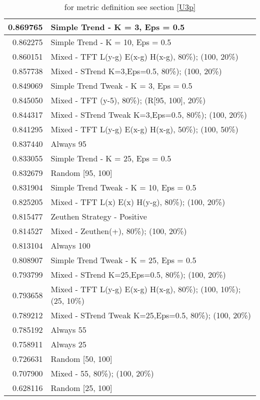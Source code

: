 \begin{table}[!hbtp]
\begin{footnotesize}
\begin{tabular}{|r|l|}
0.869765 & Simple Trend - K = 3, Eps = 0.5\\ \hline
0.862275 & Simple Trend - K = 10, Eps = 0.5\\ \hline
0.860151 & Mixed - {TFT L(y-g) E(x-g) H(x-g), 80\%); (100, 20\%)}\\ \hline
0.857738 & Mixed - {STrend K=3,Eps=0.5, 80\%); (100, 20\%)}\\ \hline
0.849069 & Simple Trend Tweak - K = 3, Eps = 0.5\\ \hline
0.845050 & Mixed - {TFT (y-5), 80\%); (R[95, 100], 20\%)}\\ \hline
0.844317 & Mixed - {STrend Tweak K=3,Eps=0.5, 80\%); (100, 20\%)}\\ \hline
0.841295 & Mixed - {TFT L(y-g) E(x-g) H(x-g), 50\%); (100, 50\%)}\\ \hline
0.837440 & Always 95\\ \hline
0.833055 & Simple Trend - K = 25, Eps = 0.5\\ \hline
0.832679 & Random [95, 100]\\ \hline
0.831904 & Simple Trend Tweak - K = 10, Eps = 0.5\\ \hline
0.825205 & Mixed - {TFT L(x) E(x) H(y-g), 80\%); (100, 20\%)}\\ \hline
0.815477 & Zeuthen Strategy - Positive\\ \hline
0.814527 & Mixed - {Zeuthen(+), 80\%); (100, 20\%)}\\ \hline
0.813104 & Always 100\\ \hline
0.808907 & Simple Trend Tweak - K = 25, Eps = 0.5\\ \hline
0.793799 & Mixed - {STrend K=25,Eps=0.5, 80\%); (100, 20\%)}\\ \hline
0.793658 & Mixed - {TFT L(y-g) E(x-g) H(x-g), 80\%); (100, 10\%); (25, 10\%)}\\ \hline
0.789212 & Mixed - {STrend Tweak K=25,Eps=0.5, 80\%); (100, 20\%)}\\ \hline
0.785192 & Always 55\\ \hline
0.758911 & Always 25\\ \hline
0.726631 & Random [50, 100]\\ \hline
0.707900 & Mixed - {55, 80\%); (100, 20\%)}\\ \hline
0.628116 & Random [25, 100]\\ \hline
\end{tabular}
\caption{for metric definition see section \eqref{U3p}}
\end{footnotesize}
\end{table}

